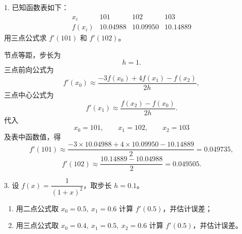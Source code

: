 \documentclass[11pt, a4paper]{ctexart}
\begin{document}
\begin{problem}{1. 已知函数表如下：}
    \[
        \begin{array}{c|ccc}
            x_i & 101 & 102 & 103 \\ \hline
            f(x_i) & 10.04988 & 10.09950 & 10.14889
        \end{array}
    \]
    用三点公式求 $f'(101)$ 和 $f'(102)$。
\end{problem}

\begin{solution}
    节点等距，步长为
    \[
        h=1.
    \]
    三点前向公式为
    \[
        f'(x_0)\approx \frac{-3f(x_0)+4f(x_1)-f(x_2)}{2h},
    \]
    三点中心公式为
    \[
        f'(x_1)\approx \frac{f(x_2)-f(x_0)}{2h}.
    \]
    代入
    \[
        x_0=101,\qquad x_1=102,\qquad x_2=103
    \]
    及表中函数值，得
    \[
        f'(101)\approx \frac{-3\times 10.04988+4\times 10.09950-10.14889}{2}=0.049735,
    \]
    \[
        f'(102)\approx \frac{10.14889-10.04988}{2}=0.049505.
    \]
\end{solution}


\begin{problem}{3. 设 $f(x)=\dfrac{1}{(1+x)^2}$，取步长 $h=0.1$。}
    \begin{enumerate}[(1)]
        \item 用二点公式取 $x_0=0.5,\ x_1=0.6$ 计算 $f'(0.5)$，并估计误差；
        \item 用三点公式取 $x_0=0.4,\ x_1=0.5,\ x_2=0.6$ 计算 $f'(0.5)$，并估计误差。
    \end{enumerate}
\end{problem}
\end{document}

